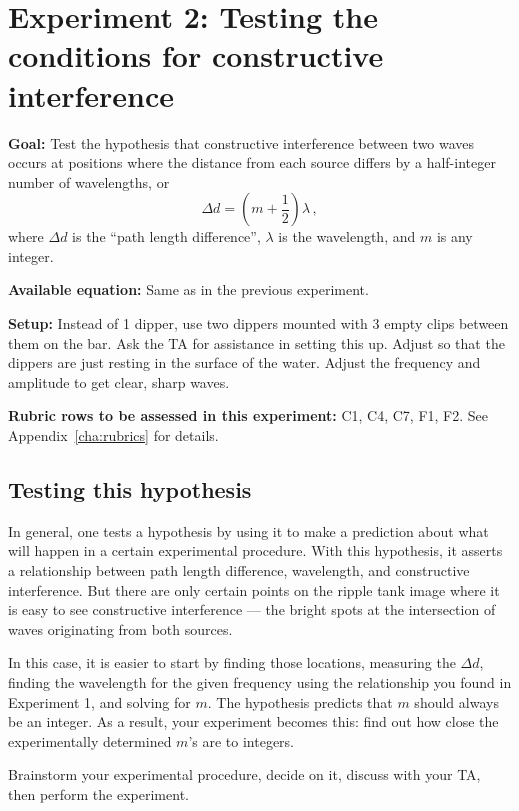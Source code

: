 \section{Experiment 2: Testing the conditions for constructive interference}

\textbf{Goal:} Test the hypothesis that constructive interference between two waves occurs at positions where the distance from each source differs by a half-integer number of wavelengths, or
\begin{equation}
 \Delta d = (m+\frac{1}{2})\lambda \,,
\end{equation}
where $\Delta d$ is the ``path length difference'', $\lambda$ is the wavelength, and $m$ is any integer.

\textbf{Available equation:} Same as in the previous experiment.

\textbf{Setup:} Instead of 1 dipper, use two dippers mounted with 3 empty clips between them on the bar. Ask the TA for assistance in setting this up. Adjust so that the dippers are just resting in the surface of the water. Adjust the frequency and amplitude to get clear, sharp waves.

\textbf{Rubric rows to be assessed in this experiment:} C1, C4, C7, F1, F2. See Appendix~\ref{cha:rubrics} for details.



\subsection{Testing this hypothesis}

In general, one tests a hypothesis by using it to make a prediction about what will happen in a certain experimental procedure. With this hypothesis, it asserts a relationship between path length difference, wavelength, and constructive interference. But there are only certain points on the ripple tank image where it is easy to see constructive interference --- the bright spots at the intersection of waves originating from both sources.

In this case, it is easier to start by finding those locations, measuring the $\Delta d$, finding the wavelength for the given frequency using the relationship you found in Experiment 1, and solving for $m$. The hypothesis predicts that $m$ should always be an integer. As a result, your experiment becomes this: find out how close the experimentally determined $m$'s are to integers.

Brainstorm your experimental procedure, decide on it, discuss with your TA, then perform the experiment.

